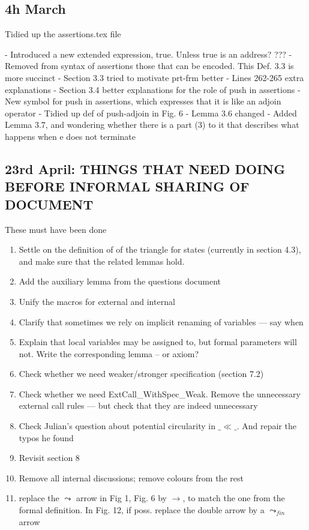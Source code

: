 \documentclass[acmsmall,review,anonymous]{acmart}\settopmatter{printfolios=true}
\begin{document}
\subsection*{4h March}

Tidied up the assertions.tex file

- Introduced a new extended expression, true. Unless true is an address? ???
- Removed from syntax of assertions those that can be encoded. This Def. 3.3 is more succinct 
- Section 3.3 tried to motivate prt-frm better 
- Lines 262-265 extra explanations 
- Section 3.4 better explanations for the role of push in assertions 
- New symbol for push in assertions, which expresses that it is like an adjoin operator
- Tidied up def of push-adjoin in Fig. 6
- Lemma 3.6 changed
- Added Lemma 3.7, and wondering whether there is a part (3) to it that describes what happens when e does not terminate

\subsection*{23rd April: THINGS THAT NEED DOING BEFORE INFORMAL SHARING OF DOCUMENT}
 
 These must have been done
\begin{enumerate}
\item
Settle on the definition of of the triangle for states (currently in section 4.3), and make sure that the related lemmas hold.
\item
Add the auxiliary lemma from the questions document
\item
Unify the macros for external and internal

\item
Clarify that sometimes we rely on implicit renaming of variables — say when

\item
Explain that local variables may be assigned to, but formal parameters will not. Write the corresponding lemma -- or axiom?

\item
Check whether we need weaker/stronger specification (section 7.2)

\item
Check whether we need ExtCall\_WithSpec\_Weak. Remove the unnecessary external call rules — but check that they are indeed unnecessary

\item
Check Julian's question about potential circularity in $\_\ll\_$. And repair the typos he found
\item
Revisit section 8

\item
Remove all internal discussions; remove colours from the rest

\item

replace the $\leadsto$ arrow in Fig 1, Fig. 6 by $\rightarrow$, to match the one from the formal definition. In Fig. 12, if poss. replace the double arrow by a $\leadsto_{fin}$ arrow 


\end{enumerate}
\end{document}
